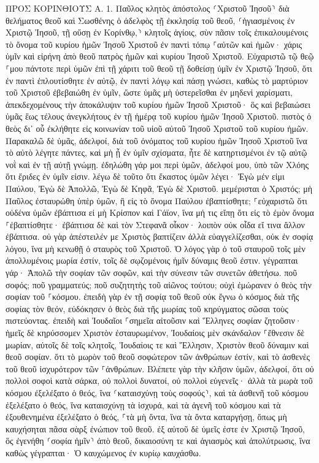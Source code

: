 \documentclass[twoside, 9pt]{extreport}
\begin{document}
ΠΡΟΣ ΚΟΡΙΝΘΙΟΥΣ Α.
1.
Παῦλος κλητὸς ἀπόστολος ⸂Χριστοῦ Ἰησοῦ⸃ διὰ θελήματος θεοῦ καὶ Σωσθένης ὁ ἀδελφὸς 
τῇ ἐκκλησίᾳ τοῦ θεοῦ, ⸂ἡγιασμένοις ἐν Χριστῷ Ἰησοῦ, τῇ οὔσῃ ἐν Κορίνθῳ,⸃ κλητοῖς ἁγίοις, σὺν πᾶσιν τοῖς ἐπικαλουμένοις τὸ ὄνομα τοῦ κυρίου ἡμῶν Ἰησοῦ Χριστοῦ ἐν παντὶ τόπῳ ⸀αὐτῶν καὶ ἡμῶν· 
χάρις ὑμῖν καὶ εἰρήνη ἀπὸ θεοῦ πατρὸς ἡμῶν καὶ κυρίου Ἰησοῦ Χριστοῦ. 
Εὐχαριστῶ τῷ θεῷ ⸀μου πάντοτε περὶ ὑμῶν ἐπὶ τῇ χάριτι τοῦ θεοῦ τῇ δοθείσῃ ὑμῖν ἐν Χριστῷ Ἰησοῦ, 
ὅτι ἐν παντὶ ἐπλουτίσθητε ἐν αὐτῷ, ἐν παντὶ λόγῳ καὶ πάσῃ γνώσει, 
καθὼς τὸ μαρτύριον τοῦ Χριστοῦ ἐβεβαιώθη ἐν ὑμῖν, 
ὥστε ὑμᾶς μὴ ὑστερεῖσθαι ἐν μηδενὶ χαρίσματι, ἀπεκδεχομένους τὴν ἀποκάλυψιν τοῦ κυρίου ἡμῶν Ἰησοῦ Χριστοῦ· 
ὃς καὶ βεβαιώσει ὑμᾶς ἕως τέλους ἀνεγκλήτους ἐν τῇ ἡμέρᾳ τοῦ κυρίου ἡμῶν Ἰησοῦ Χριστοῦ. 
πιστὸς ὁ θεὸς δι᾽ οὗ ἐκλήθητε εἰς κοινωνίαν τοῦ υἱοῦ αὐτοῦ Ἰησοῦ Χριστοῦ τοῦ κυρίου ἡμῶν. 
Παρακαλῶ δὲ ὑμᾶς, ἀδελφοί, διὰ τοῦ ὀνόματος τοῦ κυρίου ἡμῶν Ἰησοῦ Χριστοῦ ἵνα τὸ αὐτὸ λέγητε πάντες, καὶ μὴ ᾖ ἐν ὑμῖν σχίσματα, ἦτε δὲ κατηρτισμένοι ἐν τῷ αὐτῷ νοῒ καὶ ἐν τῇ αὐτῇ γνώμῃ. 
ἐδηλώθη γάρ μοι περὶ ὑμῶν, ἀδελφοί μου, ὑπὸ τῶν Χλόης ὅτι ἔριδες ἐν ὑμῖν εἰσιν. 
λέγω δὲ τοῦτο ὅτι ἕκαστος ὑμῶν λέγει· Ἐγὼ μέν εἰμι Παύλου, Ἐγὼ δὲ Ἀπολλῶ, Ἐγὼ δὲ Κηφᾶ, Ἐγὼ δὲ Χριστοῦ. 
μεμέρισται ὁ Χριστός; μὴ Παῦλος ἐσταυρώθη ὑπὲρ ὑμῶν, ἢ εἰς τὸ ὄνομα Παύλου ἐβαπτίσθητε; 
⸀εὐχαριστῶ ὅτι οὐδένα ὑμῶν ἐβάπτισα εἰ μὴ Κρίσπον καὶ Γάϊον, 
ἵνα μή τις εἴπῃ ὅτι εἰς τὸ ἐμὸν ὄνομα ⸀ἐβαπτίσθητε· 
ἐβάπτισα δὲ καὶ τὸν Στεφανᾶ οἶκον· λοιπὸν οὐκ οἶδα εἴ τινα ἄλλον ἐβάπτισα. 
οὐ γὰρ ἀπέστειλέν με Χριστὸς βαπτίζειν ἀλλὰ εὐαγγελίζεσθαι, οὐκ ἐν σοφίᾳ λόγου, ἵνα μὴ κενωθῇ ὁ σταυρὸς τοῦ Χριστοῦ. 
Ὁ λόγος γὰρ ὁ τοῦ σταυροῦ τοῖς μὲν ἀπολλυμένοις μωρία ἐστίν, τοῖς δὲ σῳζομένοις ἡμῖν δύναμις θεοῦ ἐστιν. 
γέγραπται γάρ· Ἀπολῶ τὴν σοφίαν τῶν σοφῶν, καὶ τὴν σύνεσιν τῶν συνετῶν ἀθετήσω. 
ποῦ σοφός; ποῦ γραμματεύς; ποῦ συζητητὴς τοῦ αἰῶνος τούτου; οὐχὶ ἐμώρανεν ὁ θεὸς τὴν σοφίαν τοῦ ⸀κόσμου. 
ἐπειδὴ γὰρ ἐν τῇ σοφίᾳ τοῦ θεοῦ οὐκ ἔγνω ὁ κόσμος διὰ τῆς σοφίας τὸν θεόν, εὐδόκησεν ὁ θεὸς διὰ τῆς μωρίας τοῦ κηρύγματος σῶσαι τοὺς πιστεύοντας. 
ἐπειδὴ καὶ Ἰουδαῖοι ⸀σημεῖα αἰτοῦσιν καὶ Ἕλληνες σοφίαν ζητοῦσιν· 
ἡμεῖς δὲ κηρύσσομεν Χριστὸν ἐσταυρωμένον, Ἰουδαίοις μὲν σκάνδαλον ⸀ἔθνεσιν δὲ μωρίαν, 
αὐτοῖς δὲ τοῖς κλητοῖς, Ἰουδαίοις τε καὶ Ἕλλησιν, Χριστὸν θεοῦ δύναμιν καὶ θεοῦ σοφίαν. 
ὅτι τὸ μωρὸν τοῦ θεοῦ σοφώτερον τῶν ἀνθρώπων ἐστίν, καὶ τὸ ἀσθενὲς τοῦ θεοῦ ἰσχυρότερον τῶν ⸀ἀνθρώπων. 
Βλέπετε γὰρ τὴν κλῆσιν ὑμῶν, ἀδελφοί, ὅτι οὐ πολλοὶ σοφοὶ κατὰ σάρκα, οὐ πολλοὶ δυνατοί, οὐ πολλοὶ εὐγενεῖς· 
ἀλλὰ τὰ μωρὰ τοῦ κόσμου ἐξελέξατο ὁ θεός, ἵνα ⸂καταισχύνῃ τοὺς σοφούς⸃, καὶ τὰ ἀσθενῆ τοῦ κόσμου ἐξελέξατο ὁ θεός, ἵνα καταισχύνῃ τὰ ἰσχυρά, 
καὶ τὰ ἀγενῆ τοῦ κόσμου καὶ τὰ ἐξουθενημένα ἐξελέξατο ὁ θεός, ⸀τὰ μὴ ὄντα, ἵνα τὰ ὄντα καταργήσῃ, 
ὅπως μὴ καυχήσηται πᾶσα σὰρξ ἐνώπιον τοῦ θεοῦ. 
ἐξ αὐτοῦ δὲ ὑμεῖς ἐστε ἐν Χριστῷ Ἰησοῦ, ὃς ἐγενήθη ⸂σοφία ἡμῖν⸃ ἀπὸ θεοῦ, δικαιοσύνη τε καὶ ἁγιασμὸς καὶ ἀπολύτρωσις, 
ἵνα καθὼς γέγραπται· Ὁ καυχώμενος ἐν κυρίῳ καυχάσθω. 
\end{document}
